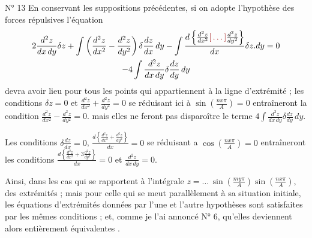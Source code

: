 \documentclass[11pt,a4paper]{article}
\begin{document}
N° 13 En conservant les suppositions précédentes, si on adopte l'hypothèse des
forces répulsives l'équation
\begin{gather*}
  2\frac{d^{2}z}{dx\,dy} \delta z
  + \int \left( \frac{d^{2}z}{dx^{2}} - \frac{d^{2}z}{dy^{2}} \right)
     \delta\frac{dz}{dx}\, dy
  - \int \frac{d\left\{ \frac{d^{2}z}{dx^{2}} \ill{} \frac{d^{2}z}{dy^{2}} \right\}}{dx}
     \delta z . dy = 0 \\
  - 4\int \frac{d^{2}z}{dx\,dy} \delta\frac{dz}{dy}\, dy
\end{gather*}
devra avoir lieu pour tous les points qui appartiennent à la ligne
d'extrémité ;  les conditions $\delta z = 0$ et
$\frac{d^{2}z}{dx^{2}} + \frac{d^{2}z}{dy^{2}} = 0$ se réduisant ici à
$\sin\left( \frac{n x \pi}{A} \right) = 0$ entraîneront la condition
$\frac{d^{2}z}{dx^{2}} - \frac{d^{2}z}{dy^{2}} = 0$. 
mais elles ne feront pas disparoître le terme
$4\int \frac{d^{2}z}{dx\,dy} \delta\frac{dz}{dy}\, dy$.

Les conditions $\delta\frac{dz}{dx} = 0$,
$\frac{d\left\{ \frac{d^{2}z}{dx^{2}} + \frac{d^{2}z}{dy^{2}} \right\}}{dx} = 0$
se réduisant a $\cos\left( \frac{n x \pi}{A} \right) = 0$ entraîneront les
conditions
$\frac{d\left\{ \frac{d^{2}z}{dx^{2}} + 3\frac{d^{2}z}{dy^{2}} \right\}}{dx} = 0$
et $\frac{d^{2}z}{dx\,dy} = 0$.

Ainsi, dans les cas qui se rapportent à l'intégrale
$z = \ldots\, \sin\left( \frac{m y \pi}{A} \right)
\sin\left( \frac{n x \pi}{A} \right)$,
des extrémités ; mais pour celle qui se meut parallèlement à sa situation
initiale, les équations d'extrémités données par l'une et l'autre hypothèses
sont satisfaites par les mêmes conditions ; et, comme je l'ai annoncé N° 6,
 qu'elles deviennent
alors entièrement équivalentes .
\end{document}
